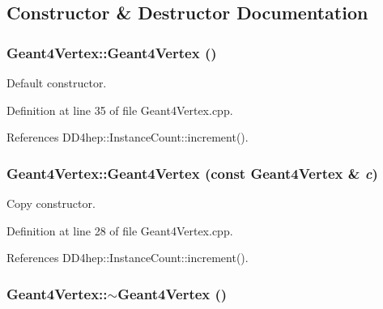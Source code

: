 \subsection{Constructor \& Destructor Documentation}
\hypertarget{class_d_d4hep_1_1_simulation_1_1_geant4_vertex_a6c266fa18efd7d4976c36074856c8bc4}{
\subsubsection[{Geant4Vertex}]{\setlength{\rightskip}{0pt plus 5cm}Geant4Vertex::Geant4Vertex ()}}
\label{class_d_d4hep_1_1_simulation_1_1_geant4_vertex_a6c266fa18efd7d4976c36074856c8bc4}


Default constructor. 

Definition at line 35 of file Geant4Vertex.cpp.

References DD4hep::InstanceCount::increment().\hypertarget{class_d_d4hep_1_1_simulation_1_1_geant4_vertex_a5a5ec2a00b5e3fcdd5bd4b5e02131dbc}{
\subsubsection[{Geant4Vertex}]{\setlength{\rightskip}{0pt plus 5cm}Geant4Vertex::Geant4Vertex (const {\bf Geant4Vertex} \& {\em c})}}
\label{class_d_d4hep_1_1_simulation_1_1_geant4_vertex_a5a5ec2a00b5e3fcdd5bd4b5e02131dbc}


Copy constructor. 

Definition at line 28 of file Geant4Vertex.cpp.

References DD4hep::InstanceCount::increment().\hypertarget{class_d_d4hep_1_1_simulation_1_1_geant4_vertex_a82165b580eeb1104f6ff9ff27235fba7}{
\subsubsection[{$\sim$Geant4Vertex}]{\setlength{\rightskip}{0pt plus 5cm}Geant4Vertex::$\sim$Geant4Vertex ()}}
\label{class_d_d4hep_1_1_simulation_1_1_geant4_vertex_a82165b580eeb1104f6ff9ff27235fba7}


